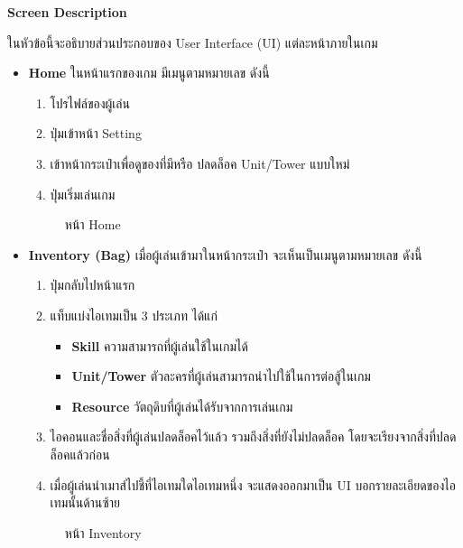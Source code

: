\documentclass[12pt,oneside,openright,a4paper]{cpe-thai-project}
\begin{document}
\textbf{Screen Description}

ในหัวข้อนี้จะอธิบายส่วนประกอบของ User Interface (UI) แต่ละหน้าภายในเกม

\begin{itemize}
  \item \textbf{Home} ในหน้าแรกของเกม มีเมนูตามหมายเลข ดังนี้
  \begin{enumerate}
    \item โปรไฟล์ของผู้เล่น
    \item ปุ่มเข้าหน้า Setting
    \item เข้าหน้ากระเป๋าเพื่อดูของที่มีหรือ ปลดล็อค Unit/Tower แบบใหม่
    \item ปุ่มเริ่มเล่นเกม
  \end{enumerate}

  \begin{figure}[H]\centering
    \setlength{\fboxsep}{0cm}
    \caption{หน้า Home}\label{fig:3-9}
  \end{figure}

  \pagebreak
  \item \textbf{Inventory (Bag)} เมื่อผู้เล่นเข้ามาในหน้ากระเป๋า 
  จะเห็นเป็นเมนูตามหมายเลข ดังนี้
  \begin{enumerate}
    \item ปุ่มกลับไปหน้าแรก
    \item แท็บแบ่งไอเทมเป็น 3 ประเภท ได้แก่
    \begin{itemize}
      \item \textbf{Skill} ความสามารถที่ผู้เล่นใช้ในเกมได้
      \item \textbf{Unit/Tower} ตัวละครที่ผู้เล่นสามารถนำไปใช้ในการต่อสู้ในเกม
      \item \textbf{Resource} วัตถุดิบที่ผู้เล่นได้รับจากการเล่นเกม
    \end{itemize}
    \item ไอคอนและชื่อสิ่งที่ผู้เล่นปลดล็อคไว้แล้ว 
    รวมถึงสิ่งที่ยังไม่ปลดล็อค โดยจะเรียงจากสิ่งที่ปลดล็อคแล้วก่อน
    \item เมื่อผู้เล่นนำเมาส์ไปชี้ที่ไอเทมใดไอเทมหนึ่ง 
    จะแสดงออกมาเป็น UI บอกรายละเอียดของไอเทมนั้นด้านซ้าย
  \end{enumerate}

  \begin{figure}[H]\centering
    \setlength{\fboxsep}{0cm}
    \caption{หน้า Inventory}\label{fig:3-10}
  \end{figure}


\end{itemize}
\end{document}
